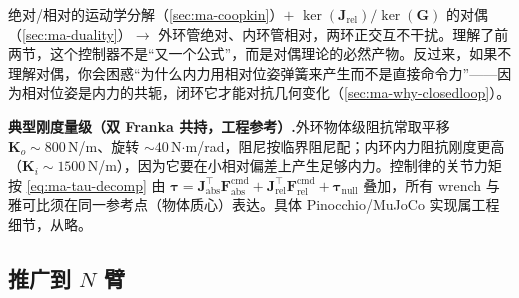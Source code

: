 \begin{insight}
绝对/相对的运动学分解（\cref{sec:ma-coopkin}）$+$ $\ker(\mathbf{J}_{\text{rel}})/\ker(\mathbf{G})$ 的对偶（\cref{sec:ma-duality}）$\to$ 外环管绝对、内环管相对，两环正交互不干扰。理解了前两节，这个控制器不是“又一个公式”，而是对偶理论的必然产物。反过来，如果不理解对偶，你会困惑“为什么内力用相对位姿弹簧来产生而不是直接命令力”——因为相对位姿是内力的共轭，闭环它才能对抗几何变化（\cref{sec:ma-why-closedloop}）。
\end{insight}

\begin{note}
\textbf{典型刚度量级（双 Franka 共持，工程参考）.}\;外环物体级阻抗常取平移 $\mathbf{K}_o\sim800$\,N/m、旋转 $\sim40$\,N$\cdot$m/rad，阻尼按临界阻尼配；内环内力阻抗刚度更高（$\mathbf{K}_i\sim1500$\,N/m），因为它要在小相对偏差上产生足够内力。控制律的关节力矩按 \cref{eq:ma-tau-decomp} 由 $\boldsymbol{\tau}=\mathbf{J}_{\text{abs}}^\top\mathbf{F}_{\text{abs}}^{\text{cmd}}+\mathbf{J}_{\text{rel}}^\top\mathbf{F}_{\text{rel}}^{\text{cmd}}+\boldsymbol{\tau}_{\text{null}}$ 叠加，所有 wrench 与雅可比须在同一参考点（物体质心）表达。具体 Pinocchio/MuJoCo 实现属工程细节，从略。
\end{note}

\subsection{推广到 $N$ 臂}
\label{sec:ma-narm}

